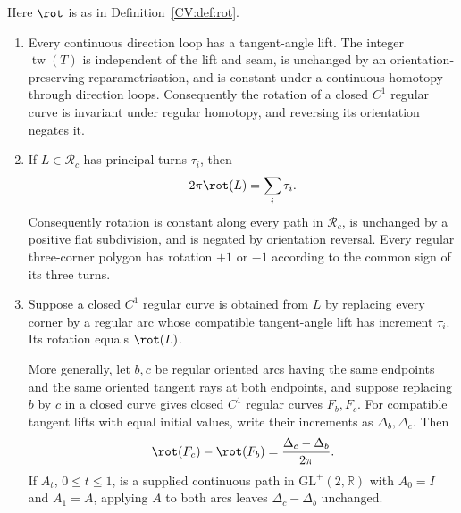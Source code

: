\begin{lemma}\label{CV:lem:turnlift}\leanok
Here $\rot$ is as in Definition~\ref{CV:def:rot}.
\begin{enumerate}
\item[(i)] Every continuous direction loop has a tangent-angle lift.
The integer $\operatorname{tw}(T)$ is independent of the lift and seam,
is unchanged by an orientation-preserving reparametrisation, and is constant
under a continuous homotopy through direction loops. Consequently the rotation
of a closed $C^1$ regular curve is invariant under regular homotopy, and
reversing its orientation negates it.
\item[(ii)] If $L\in\mathcal R_c$ has principal turns $\tau_i$, then
\[
   2\pi\rot(L)=\sum_i\tau_i.
\]
Consequently rotation is constant along every path in $\mathcal R_c$, is
unchanged by a positive flat subdivision, and is negated by orientation
reversal. Every regular three-corner polygon has rotation $+1$ or $-1$
according to the common sign of its three turns.
\item[(iii)] Suppose a closed $C^1$ regular curve is obtained from $L$ by
replacing every corner by a regular arc whose compatible tangent-angle lift
has increment $\tau_i$. Its rotation equals $\rot(L)$.

More generally, let $b,c$ be regular oriented arcs having the same endpoints
and the same oriented tangent rays at both endpoints, and suppose replacing
$b$ by $c$ in a closed curve gives closed $C^1$ regular curves $F_b,F_c$.
For compatible tangent lifts with equal initial values, write their increments
as $\Delta_b,\Delta_c$. Then
\[
   \rot(F_c)-\rot(F_b)=\frac{\Delta_c-\Delta_b}{2\pi}.
\]
If $A_t$, $0\leq t\leq1$, is a supplied continuous path in
$\mathrm{GL}^+(2,\mathbb R)$ with $A_0=I$ and $A_1=A$, applying $A$ to both
arcs leaves $\Delta_c-\Delta_b$ unchanged.
\end{enumerate}
\end{lemma}
